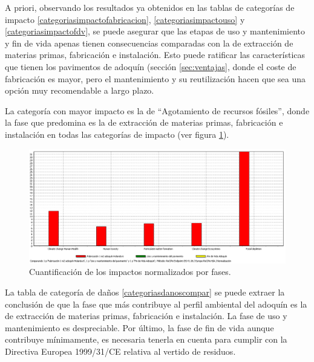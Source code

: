 
A priori, observando los resultados ya obtenidos en las tablas de categorías de impacto \ref{categoriasimpactofabricacion}, \ref{categoriasimpactouso} y \ref{categoriasimpactofdv}, se puede asegurar que las etapas de uso y mantenimiento y fin de vida apenas tienen consecuencias comparadas con la de extracción de materias primas, fabricación e instalación. Esto puede ratificar las características que tienen los pavimentos de adoquín (sección \ref{sec:ventajas}, donde el coste de fabricación es mayor, pero el mantenimiento y su reutilización hacen que sea una opción muy recomendable a largo plazo.

La categoría con mayor impacto es la de ``Agotamiento de recursos fósiles'', donde la fase que predomina es la de extracción de materias primas, fabricación e instalación en todas las categorías de impacto (ver figura \ref{fig:compar_normalizacion}).

\begin{figure}[!htb]
\centering
\includegraphics[width=15cm]{img/compar_normalizacion.png}
\caption{Cuantificación de los impactos normalizados por fases.}
\label{fig:compar_normalizacion}
\end{figure}

La tabla de categoría de daños \ref{categoriasdanoscompar} se puede extraer la conclusión de que la fase que más contribuye al perfil ambiental del adoquín es la de extracción de materias primas, fabricación e instalación. La fase de uso y mantenimiento es despreciable. Por último, la fase de fin de vida aunque contribuye mínimamente, es necesaria tenerla en cuenta para cumplir con la Directiva Europea 1999/31/CE relativa al vertido de residuos.

